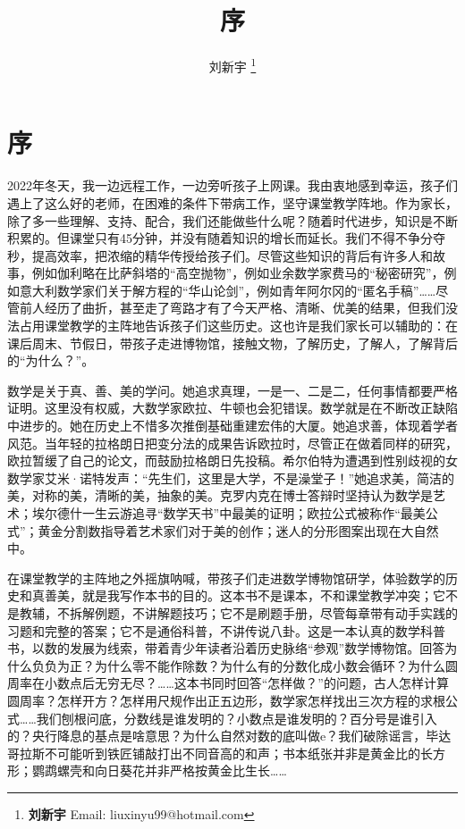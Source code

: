 \documentclass[b5paper]{ctexart}
\begin{document}
\title{序}

\author{刘新宇
\thanks{{\bfseries 刘新宇} \newline
  Email: liuxinyu99@hotmail.com \newline}
  }

\maketitle
\fi


\chapter*{序}

2022年冬天，我一边远程工作，一边旁听孩子上网课。我由衷地感到幸运，孩子们遇上了这么好的老师，在困难的条件下带病工作，坚守课堂教学阵地。作为家长，除了多一些理解、支持、配合，我们还能做些什么呢？随着时代进步，知识是不断积累的。但课堂只有45分钟，并没有随着知识的增长而延长。我们不得不争分夺秒，提高效率，把浓缩的精华传授给孩子们。尽管这些知识的背后有许多人和故事，例如伽利略在比萨斜塔的“高空抛物”，例如业余数学家费马的“秘密研究”，例如意大利数学家们关于解方程的“华山论剑”，例如青年阿尔冈的“匿名手稿”……尽管前人经历了曲折，甚至走了弯路才有了今天严格、清晰、优美的结果，但我们没法占用课堂教学的主阵地告诉孩子们这些历史。这也许是我们家长可以辅助的：在课后周末、节假日，带孩子走进博物馆，接触文物，了解历史，了解人，了解背后的“为什么？”。

数学是关于真、善、美的学问。她追求真理，一是一、二是二，任何事情都要严格证明。这里没有权威，大数学家欧拉、牛顿也会犯错误。数学就是在不断改正缺陷中进步的。她在历史上不惜多次推倒基础重建宏伟的大厦。她追求善，体现着学者风范。当年轻的拉格朗日把变分法的成果告诉欧拉时，尽管正在做着同样的研究，欧拉暂缓了自己的论文，而鼓励拉格朗日先投稿。希尔伯特为遭遇到性别歧视的女数学家艾米·诺特发声：“先生们，这里是大学，不是澡堂子！”她追求美，简洁的美，对称的美，清晰的美，抽象的美。克罗内克在博士答辩时坚持认为数学是艺术；埃尔德什一生云游追寻“数学天书”中最美的证明；欧拉公式被称作“最美公式”；黄金分割数指导着艺术家们对于美的创作；迷人的分形图案出现在大自然中。

在课堂教学的主阵地之外摇旗呐喊，带孩子们走进数学博物馆研学，体验数学的历史和真善美，就是我写作本书的目的。这本书不是课本，不和课堂教学冲突；它不是教辅，不拆解例题，不讲解题技巧；它不是刷题手册，尽管每章带有动手实践的习题和完整的答案；它不是通俗科普，不讲传说八卦。这是一本认真的数学科普书，以数的发展为线索，带着青少年读者沿着历史脉络“参观”数学博物馆。回答为什么负负为正？为什么零不能作除数？为什么有的分数化成小数会循环？为什么圆周率在小数点后无穷无尽？……这本书同时回答“怎样做？”的问题，古人怎样计算圆周率？怎样开方？怎样用尺规作出正五边形，数学家怎样找出三次方程的求根公式……我们刨根问底，分数线是谁发明的？小数点是谁发明的？百分号是谁引入的？央行降息的基点是啥意思？为什么自然对数的底叫做e？我们破除谣言，毕达哥拉斯不可能听到铁匠铺敲打出不同音高的和声；书本纸张并非是黄金比的长方形；鹦鹉螺壳和向日葵花并非严格按黄金比生长……
\end{document}

